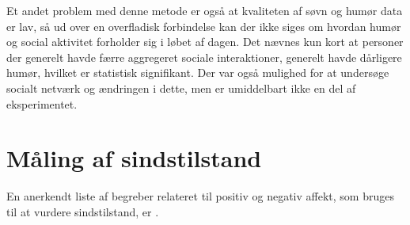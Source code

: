 Et andet problem med denne metode er også at kvaliteten af søvn og humør data er lav, så ud over en overfladisk forbindelse kan der ikke siges om hvordan humør og social aktivitet forholder sig i løbet af dagen.
Det nævnes kun kort at personer der generelt havde færre aggregeret sociale interaktioner, generelt havde dårligere humør, hvilket er statistisk signifikant.
Der var også mulighed for at undersøge socialt netværk og ændringen i dette, men er umiddelbart ikke en del af eksperimentet.

\section{Måling af sindstilstand}
En anerkendt liste af begreber relateret til positiv og negativ affekt, som bruges til at vurdere sindstilstand, er \citet{panas}.

